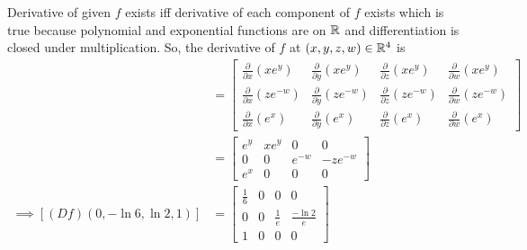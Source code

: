 \begin{soln}{3}
   Derivative of given $ f $ exists iff derivative of each component of $ f $ exists which is true because polynomial and exponential functions are \diff on $ \mathbb{R} $ and differentiation is closed under multiplication. So, the derivative of $ f $ at $ (x,y,z,w) \in \mathbb{R}^4 $ is
   \begin{align*}
    [(Df)(x,y,z,w)] 
    &= \begin{bmatrix}
      \frac{\partial}{\partial x}(xe^y) &\frac{\partial}{\partial y}(xe^y) &\frac{\partial}{\partial z}(xe^y) &\frac{\partial}{\partial w}(xe^y) \\ 
      \frac{\partial}{\partial x}(ze^{-w}) &\frac{\partial}{\partial y}(ze^{-w}) &\frac{\partial}{\partial z}(ze^{-w}) &\frac{\partial}{\partial w}(ze^{-w}) \\ 
      \frac{\partial}{\partial x}(e^x) &\frac{\partial}{\partial y}(e^x) &\frac{\partial}{\partial z}(e^x) &\frac{\partial}{\partial w}(e^x)
    \end{bmatrix} \\ 
    &= \begin{bmatrix}
      e^y & xe^y & 0 & 0 \\ 
      0 & 0 & e^{-w} & -ze^{-w} \\ 
      e^x & 0 & 0 & 0
    \end{bmatrix} \\
    \implies [(Df)(0,-\ln6,\ln2,1)] &= \begin{bmatrix}
      \frac{1}{6} & 0 & 0 & 0 \\ 
      0 & 0 & \frac{1}{e} & \frac{-\ln2}{e} \\ 
      1 & 0 & 0 & 0
    \end{bmatrix}
   \end{align*}
\end{soln}